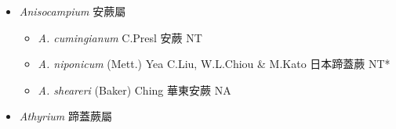 
  \begin{itemize}
 \item[] \textit{Anisocampium} 安蕨屬
                                
  \begin{itemize}
        \item[] \textit{A. cumingianum} C.Presl  安蕨   NT
        \item[] \textit{A. niponicum} (Mett.) Yea C.Liu, W.L.Chiou \& M.Kato  日本蹄蓋蕨   NT*
        \item[] \textit{A. sheareri} (Baker) Ching  華東安蕨   NA
  \end{itemize}
 \item[] \textit{Athyrium} 蹄蓋蕨屬
                                

\end{itemize}
